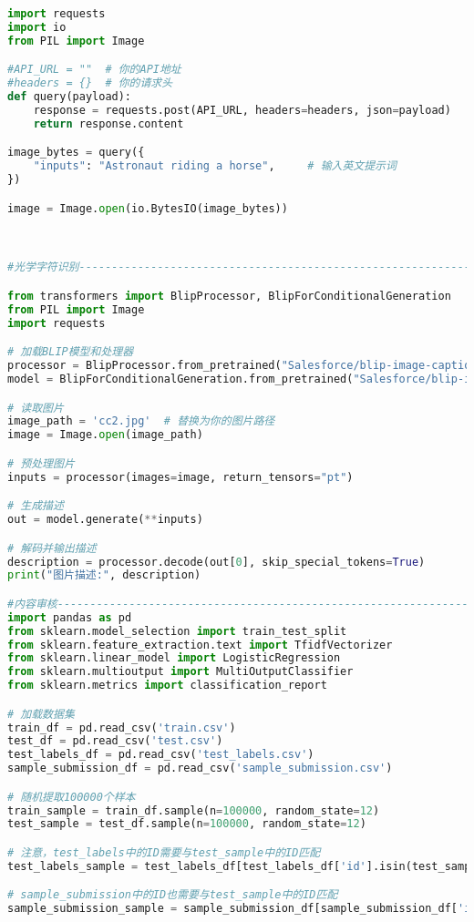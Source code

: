 \documentclass{article}
\begin{document}
\begin{lstlisting}[language=Python]
import requests
import io
from PIL import Image

#API_URL = ""  # 你的API地址
#headers = {}  # 你的请求头
def query(payload):
    response = requests.post(API_URL, headers=headers, json=payload)
    return response.content

image_bytes = query({
    "inputs": "Astronaut riding a horse",     # 输入英文提示词
})

image = Image.open(io.BytesIO(image_bytes))



#光学字符识别-------------------------------------------------------------------------------------

from transformers import BlipProcessor, BlipForConditionalGeneration
from PIL import Image
import requests

# 加载BLIP模型和处理器
processor = BlipProcessor.from_pretrained("Salesforce/blip-image-captioning-base")
model = BlipForConditionalGeneration.from_pretrained("Salesforce/blip-image-captioning-base")

# 读取图片
image_path = 'cc2.jpg'  # 替换为你的图片路径
image = Image.open(image_path)

# 预处理图片
inputs = processor(images=image, return_tensors="pt")

# 生成描述
out = model.generate(**inputs)

# 解码并输出描述
description = processor.decode(out[0], skip_special_tokens=True)
print("图片描述:", description)

#内容审核-----------------------------------------------------------------------------
import pandas as pd
from sklearn.model_selection import train_test_split
from sklearn.feature_extraction.text import TfidfVectorizer
from sklearn.linear_model import LogisticRegression
from sklearn.multioutput import MultiOutputClassifier
from sklearn.metrics import classification_report

# 加载数据集
train_df = pd.read_csv('train.csv')
test_df = pd.read_csv('test.csv')
test_labels_df = pd.read_csv('test_labels.csv')
sample_submission_df = pd.read_csv('sample_submission.csv')

# 随机提取100000个样本
train_sample = train_df.sample(n=100000, random_state=12)
test_sample = test_df.sample(n=100000, random_state=12)

# 注意，test_labels中的ID需要与test_sample中的ID匹配
test_labels_sample = test_labels_df[test_labels_df['id'].isin(test_sample['id'])]

# sample_submission中的ID也需要与test_sample中的ID匹配
sample_submission_sample = sample_submission_df[sample_submission_df['id'].isin(test_sample['id'])]


\end{lstlisting}
\end{document}
